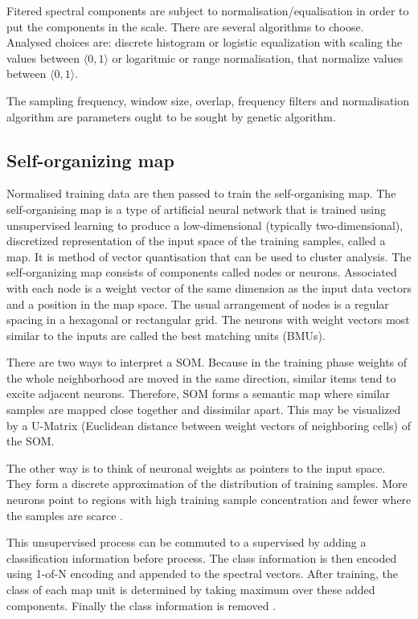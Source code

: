 \documentclass[a4paper,jurnal]{IEEEtran}
\begin{document}
Fitered spectral components are subject to normalisation/equalisation
in order to put the components
in the scale. There are several algorithms to choose. Analysed choices are:
discrete histogram \cite{hist} or logistic equalization with scaling the values between 
$ \langle 0, 1 \rangle $ or logaritmic or range normalisation, that normalize
values between $ \langle 0, 1 \rangle $.

The sampling frequency, window size, overlap, frequency filters and 
normalisation algorithm
are parameters ought to be sought by genetic algorithm.

\subsection{Self-organizing map}
Normalised training data are then passed to train 
the self-organising map.
The self-organising map is a type of artificial neural network that is
trained using unsupervised learning to produce a low-dimensional 
(typically two-dimensional), discretized representation of the input 
space of the training samples, called a map. It is method of vector 
quantisation that can be used to 
cluster analysis.
The self-organizing map consists of components called nodes or neurons. 
Associated with each node is a weight vector of the same dimension 
as the input data vectors and a position in the map space. 
The usual arrangement of nodes is a regular spacing in a hexagonal or rectangular grid. 
The neurons with weight vectors most similar to the inputs are called 
the best matching units (BMUs).

There are two ways to interpret a SOM. 
Because in the training phase weights of the whole neighborhood are moved in the 
same direction, similar items tend to excite adjacent neurons. Therefore, 
SOM forms a semantic map where similar samples are mapped close together 
and dissimilar apart. This may be visualized by a U-Matrix 
(Euclidean distance between weight vectors of neighboring cells) of the SOM.

The other way is to think of neuronal weights as pointers to the input space. 
They form a discrete approximation of the distribution of training samples.
More neurons point to regions with high training sample concentration and 
fewer where the samples are scarce \cite{somwiki}.

This unsupervised process can be commuted to a supervised by adding a classification
information before process.
The class information is then encoded using 1-of-N encoding and appended to the 
spectral vectors. After training, the class of each map unit
is determined by taking maximum over these added components.
Finally the class information is removed \cite{somtoolbox}.
\end{document}
